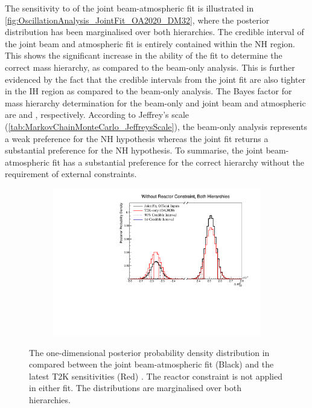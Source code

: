 The sensitivity to  of the joint beam-atmospheric fit is illustrated in \autoref{fig:OscillationAnalysis_JointFit_OA2020_DM32}, where the posterior distribution has been marginalised over both hierarchies. The \quickmath{1\sigma} credible interval of the joint beam and atmospheric fit is entirely contained within the NH region. This shows the significant increase in the ability of the fit to determine the correct mass hierarchy, as compared to the beam-only analysis. This is further evidenced by the fact that the  credible intervals from the joint fit are also tighter in the IH region as compared to the beam-only analysis. The Bayes factor for mass hierarchy determination for the beam-only and joint beam and atmospheric are  and , respectively. According to Jeffrey's scale (\autoref{tab:MarkovChainMonteCarlo_JeffreysScale}), the beam-only analysis represents a weak preference for the NH hypothesis whereas the joint fit returns a substantial preference for the NH hypothesis. To summarise, the joint beam-atmospheric fit has a substantial preference for the correct hierarchy without the requirement of external constraints.

\begin{figure}[h]
  \begin{subfigure}[t]{0.98\textwidth}
    \includegraphics[width=\textwidth, trim={0mm 0mm 0mm 0mm}, clip,page=1]{Figures/OA/JointFit_OA2020_Comp/ContourComparison_1D_dm32_BH_2_woRC_UnSmeared_CredibleInterval.pdf}
  \end{subfigure}
  \caption{The one-dimensional posterior probability density distribution in  compared between the joint beam-atmospheric fit (Black) and the latest T2K sensitivities (Red) \cite{t2k_tn_399}. The reactor constraint is not applied in either fit. The distributions are marginalised over both hierarchies.}
  \label{fig:OscillationAnalysis_JointFit_OA2020_DM32}
\end{figure}

